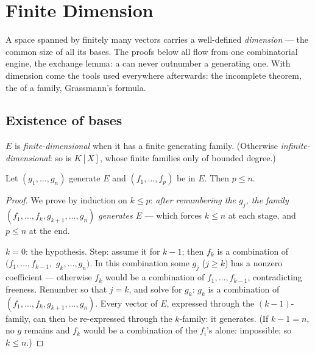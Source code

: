\chapter{Finite Dimension}\label{ch:b1:findim}

A space spanned by finitely many vectors carries a well-defined
\emph{dimension} --- the common size of all its bases. The proofs
below all flow from one combinatorial engine, the exchange lemma:
a  can never outnumber a generating one. With dimension
come the tools used everywhere afterwards: the incomplete 
theorem, the  of a family, Grassmann's formula.

\section{Existence of bases}

\begin{definition}\label{def:b1:findim:def}
$E$ is \emph{finite-dimensional} when it has
a finite generating family. (Otherwise \emph{infinite-dimensional}:
so is $K[X]$, whose finite families only   of bounded
degree.)
\end{definition}

\begin{theorem}\label{thm:b1:findim:exchange}
Let $(g_1, \dots, g_n)$ generate $E$ and $(f_1, \dots, f_p)$ be 
in $E$. Then $p \leq n$.
\end{theorem}

\begin{proof}
We prove by induction on $k \leq p$: \emph{after renumbering the
$g_j$, the family $(f_1, \dots, f_k, g_{k+1}, \dots, g_n)$ generates
$E$} --- which forces $k \leq n$ at each stage, and $p \leq n$ at
the end.

$k = 0$: the hypothesis. Step: assume it for $k - 1$; then $f_k$ is
a combination of $(f_1, \dots, f_{k-1},$ $g_k, \dots, g_n)$. In
this combination some $g_j$ ($j \geq k$) has a nonzero coefficient
---
otherwise $f_k$ would be a combination of $f_1, \dots, f_{k-1}$,
contradicting freeness. Renumber so that $j = k$, and solve for
$g_k$: $g_k$ is a combination of $(f_1, \dots, f_k, g_{k+1}, \dots,
g_n)$. Every vector of $E$, expressed through the $(k-1)$-family,
can then be re-expressed through the $k$-family: it generates.
(If $k - 1 = n$, no $g$ remains and $f_k$ would be a combination of
the $f_i$'s alone: impossible; so $k \leq n$.)
\end{proof}

